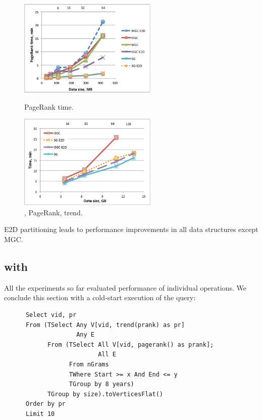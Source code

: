 \begin{figure}[t]
\centering
\begin{minipage}{3in}
  \centering
  \includegraphics[width=2.6in]{figs/pagerank.pdf}
  \vspace{-0.1in}
  \caption{PageRank time.}
  \label{fig:pagerank}
  \vspace{-0.1in}
\end{minipage}
\begin{minipage}{3in}
  \centering
\includegraphics[width=2.6in]{figs/complexq.pdf}
  \vspace{-0.1in}
\caption{, PageRank, trend.}
\label{fig:complexq}
  \vspace{-0.1in}
\end{minipage}
\end{figure}

E2D partitioning leads to performance improvements in all data
structures except MGC.

\subsection{ with }

All the experiments so far evaluated performance of individual \ql
operations. We conclude this section with a cold-start execution of
the query:

\begin{small}
\begin{verbatim}
      Select vid, pr
      From (TSelect Any V[vid, trend(prank) as pr]
                    Any E
            From (TSelect All V[vid, pagerank() as prank]; 
                          All E
                  From nGrams
                  TWhere Start >= x And End <= y
                  TGroup by 8 years)
            TGroup by size).toVerticesFlat()
      Order by pr
      Limit 10
\end{verbatim}
\end{small}

